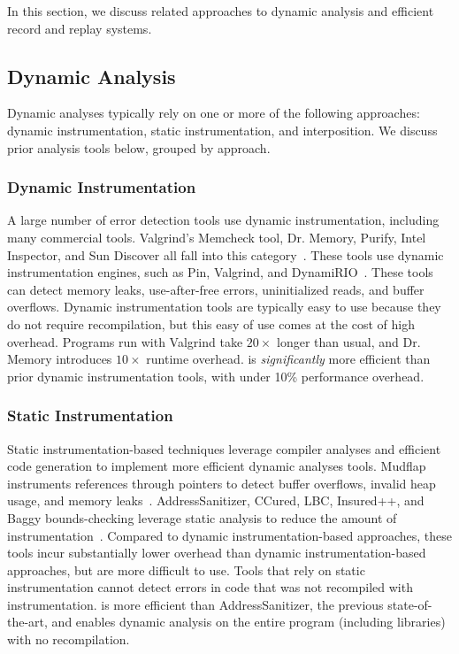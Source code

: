 In this section, we discuss related approaches to dynamic analysis and efficient record and replay systems.

\subsection{Dynamic Analysis}
Dynamic analyses typically rely on one or more of the following approaches: dynamic instrumentation, static instrumentation, and interposition. We discuss prior analysis tools below, grouped by approach.

\subsubsection*{Dynamic Instrumentation} 
A large number of error detection tools use dynamic instrumentation, including many commercial tools. Valgrind's Memcheck tool, Dr. Memory, Purify, Intel Inspector, and Sun Discover all fall into this category~\cite{ overflow:drmemory, overflow:purify, overflow:inspector, overflow:valgrind, overflow:discover}. These tools use dynamic instrumentation engines, such as Pin, Valgrind, and DynamiRIO~\cite{DynamoRIO, Pin, overflow:valgrind}. These tools can detect memory leaks, use-after-free errors, uninitialized reads, and buffer overflows. Dynamic instrumentation tools are typically easy to use because they do not require recompilation, but this easy of use comes at the cost of high overhead. Programs run with Valgrind take $20\times$ longer than usual, and Dr. Memory introduces $10\times$ runtime overhead. \doubletake{} is \emph{significantly} more efficient than prior dynamic instrumentation tools, with under 10\% performance overhead.

\subsubsection*{Static Instrumentation}
Static instrumentation-based techniques leverage compiler analyses and efficient code generation to implement more efficient dynamic analyses tools. Mudflap instruments references through pointers to detect buffer overflows, invalid heap usage, and memory leaks~\cite{overflow:Mudflap}. AddressSanitizer, CCured, LBC, Insured++, and Baggy bounds-checking leverage static analysis to reduce the amount of instrumentation~\cite{overflow:Baggy, overflow:lbc,  overflow:ccured, AddressSanitizer}. Compared to dynamic instrumentation-based approaches, these tools incur substantially lower overhead than dynamic instrumentation-based approaches, but are more difficult to use. Tools that rely on static instrumentation cannot detect errors in code that was not recompiled with instrumentation. \doubletake{} is more efficient than AddressSanitizer, the previous state-of-the-art, and enables dynamic analysis on the entire program (including libraries) with no recompilation.

